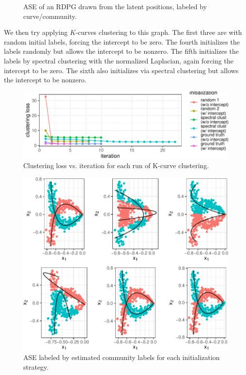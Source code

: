 \documentclass[12pt]{article}
\begin{document}
\begin{example}
\begin{figure}[H]
{}

\caption{ASE of an RDPG drawn from the latent positions, labeled by curve/community.}\label{fig:unnamed-chunk-3}
\end{figure}

We then try applying $K$-curves clustering to this graph. 
The first three are with random initial labels, forcing the intercept to be zero. 
The fourth initializes the labels randomly but allows the intercept to be nonzero. 
The fifth initializes the labels by spectral clustering with the normalized Laplacian, again forcing the intercept to be zero. 
The sixth also initializes via spectral clustering but allows the intercept to be nonzero. 





\begin{figure}[H]

{\centering \includegraphics{draft_files/figure-latex/unnamed-chunk-6-1} 

}

\caption{Clustering loss vs. iteration for each run of K-curve clustering.}\label{fig:unnamed-chunk-6}
\end{figure}

\begin{figure}[H]

{\centering \includegraphics{draft_files/figure-latex/unnamed-chunk-7-1} 

}

\caption{ASE labeled by estimated community labels for each initialization strategy.}\label{fig:unnamed-chunk-7}
\end{figure}

\end{example}
\end{document}
